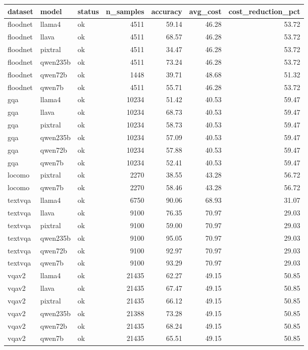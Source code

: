 \begin{tabular}{lllrrrr}
\toprule
dataset & model & status & n_samples & accuracy & avg_cost & cost_reduction_pct \\
\midrule
floodnet & llama4 & ok & 4511 & 59.14 & 46.28 & 53.72 \\
floodnet & llava & ok & 4511 & 68.57 & 46.28 & 53.72 \\
floodnet & pixtral & ok & 4511 & 34.47 & 46.28 & 53.72 \\
floodnet & qwen235b & ok & 4511 & 73.24 & 46.28 & 53.72 \\
floodnet & qwen72b & ok & 1448 & 39.71 & 48.68 & 51.32 \\
floodnet & qwen7b & ok & 4511 & 55.71 & 46.28 & 53.72 \\
gqa & llama4 & ok & 10234 & 51.42 & 40.53 & 59.47 \\
gqa & llava & ok & 10234 & 68.73 & 40.53 & 59.47 \\
gqa & pixtral & ok & 10234 & 58.73 & 40.53 & 59.47 \\
gqa & qwen235b & ok & 10234 & 57.09 & 40.53 & 59.47 \\
gqa & qwen72b & ok & 10234 & 57.88 & 40.53 & 59.47 \\
gqa & qwen7b & ok & 10234 & 52.41 & 40.53 & 59.47 \\
locomo & pixtral & ok & 2270 & 38.55 & 43.28 & 56.72 \\
locomo & qwen7b & ok & 2270 & 58.46 & 43.28 & 56.72 \\
textvqa & llama4 & ok & 6750 & 90.06 & 68.93 & 31.07 \\
textvqa & llava & ok & 9100 & 76.35 & 70.97 & 29.03 \\
textvqa & pixtral & ok & 9100 & 59.00 & 70.97 & 29.03 \\
textvqa & qwen235b & ok & 9100 & 95.05 & 70.97 & 29.03 \\
textvqa & qwen72b & ok & 9100 & 92.97 & 70.97 & 29.03 \\
textvqa & qwen7b & ok & 9100 & 93.29 & 70.97 & 29.03 \\
vqav2 & llama4 & ok & 21435 & 62.27 & 49.15 & 50.85 \\
vqav2 & llava & ok & 21435 & 67.47 & 49.15 & 50.85 \\
vqav2 & pixtral & ok & 21435 & 66.12 & 49.15 & 50.85 \\
vqav2 & qwen235b & ok & 21388 & 73.28 & 49.15 & 50.85 \\
vqav2 & qwen72b & ok & 21435 & 68.24 & 49.15 & 50.85 \\
vqav2 & qwen7b & ok & 21435 & 65.51 & 49.15 & 50.85 \\
\bottomrule
\end{tabular}
